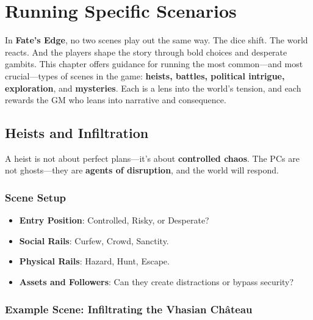 \chapter{Running Specific Scenarios}

In \textbf{Fate's Edge}, no two scenes play out the same way. The dice shift. The world reacts. And the players shape the story through bold choices and desperate gambits. This chapter offers guidance for running the most common---and most crucial---types of scenes in the game: \textbf{heists, battles, political intrigue, exploration}, and \textbf{mysteries}. Each is a lens into the world's tension, and each rewards the GM who leans into narrative and consequence.

\section*{Heists and Infiltration}

A heist is not about perfect plans---it's about \textbf{controlled chaos}. The PCs are not ghosts---they are \textbf{agents of disruption}, and the world will respond.

\subsection*{Scene Setup}

\begin{itemize}
    \item \textbf{Entry Position}: Controlled, Risky, or Desperate?
    \item \textbf{Social Rails}: Curfew, Crowd, Sanctity.
    \item \textbf{Physical Rails}: Hazard, Hunt, Escape.
    \item \textbf{Assets and Followers}: Can they create distractions or bypass security?
\end{itemize}

\subsection*{Example Scene: Infiltrating the Vhasian Château}

